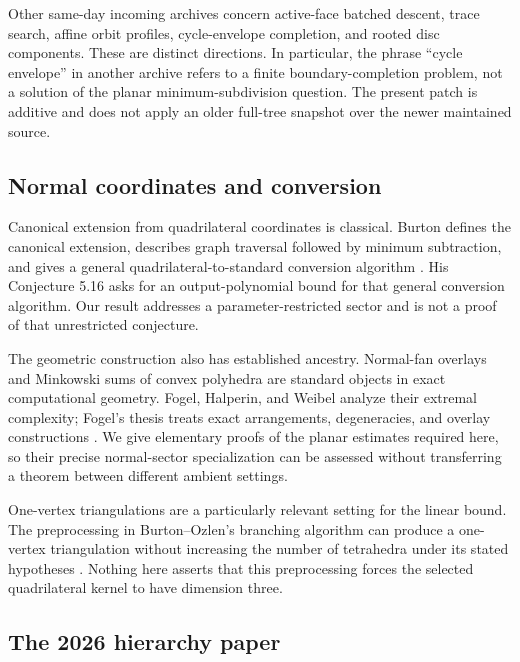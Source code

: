 \documentclass[11pt,letterpaper]{article}
\theoremstyle{definition}
\theoremstyle{remark}\newtheorem{remark}[theorem]{Remark}
\begin{document}
Other same-day incoming archives concern active-face batched descent,
trace search, affine orbit profiles, cycle-envelope completion, and rooted
disc components. These are distinct directions. In particular, the phrase
``cycle envelope'' in another archive refers to a finite boundary-completion
problem, not a solution of the planar minimum-subdivision question. The
present patch is additive and does not apply an older full-tree snapshot
over the newer maintained source.

\subsection{Normal coordinates and conversion}

Canonical extension from quadrilateral coordinates is classical. Burton
defines the canonical extension, describes graph traversal followed by
minimum subtraction, and gives a general quadrilateral-to-standard conversion
algorithm \cite{burtonconversion}. His Conjecture 5.16 asks for an
output-polynomial bound for that general conversion algorithm. Our result
addresses a parameter-restricted sector and is not a proof of that
unrestricted conjecture.

The geometric construction also has established ancestry. Normal-fan overlays
and Minkowski sums of convex polyhedra are standard objects in exact
computational geometry. Fogel, Halperin, and Weibel analyze their extremal
complexity; Fogel's thesis treats exact arrangements, degeneracies, and
overlay constructions \cite{fogelweibel,fogelthesis}. We give elementary
proofs of the planar estimates required here, so their precise normal-sector
specialization can be assessed without transferring a theorem between
different ambient settings.

One-vertex triangulations are a particularly relevant setting for the
linear bound. The preprocessing in Burton--Ozlen's branching algorithm can
produce a one-vertex triangulation without increasing the number of
tetrahedra under its stated hypotheses \cite{burtonozlen}. Nothing here
asserts that this preprocessing forces the selected quadrilateral kernel
to have dimension three.

\subsection{The 2026 hierarchy paper}
\end{document}
